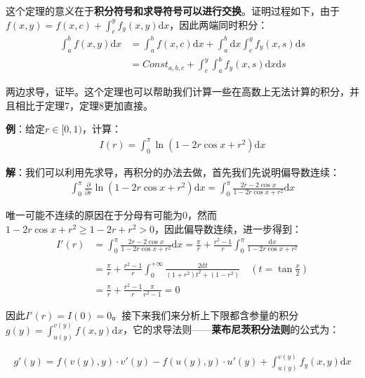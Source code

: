 \documentclass{ctexart}
\let\oldtextbf\textbf
\renewcommand{\textbf}[1]{\textcolor{brown!50!red}{\oldtextbf{#1}}}
\begin{document}
这个定理的意义在于\textbf{\color{brown!50!red}积分符号和求导符号可以进行交换}。证明过程如下，由于$f(x,y)=f(x,c)+\int_c^y f_y(x,y)\mathrm{d}x$，因此两端同时积分：
\begin{align*}
  \int_a^bf(x,y)\mathrm{d}x&=\int_a^b f(x,c)\mathrm{d}x+ \int_a^b\mathrm{d}x\int_c^yf_y(x,s)\mathrm{d}s\\
   &=Const_{a,b,c}+\int_c^y\int_a^b f_y(x,s)\mathrm{d}x\mathrm{d}s
\end{align*}

两边求导，证毕。这个定理也可以帮助我们计算一些在高数上无法计算的积分，并且相比于定理7，定理8更加直接。

\textbf{\color{brown!50!red}例}：给定$r\in[0,1)$，计算：
\begin{align*}
    I(r)=\int_0^\pi \ln(1-2r\cos x+r^2)\mathrm{d}x
\end{align*}

\textbf{\color{brown!50!red}解}：我们可以利用先求导，再积分的办法去做，首先我们先说明偏导数连续：
\begin{align*}
 \int_0^\pi \frac{\partial}{\partial r} \ln(1-2r\cos x+r^2)\mathrm{d}x=\int_0^\pi \frac{2r-2\cos x}
{1-2r\cos x+r^2}\mathrm{d}x  
\end{align*}

唯一可能不连续的原因在于分母有可能为0，然而$1-2r\cos x+r^2\geq 1-2r+r^2>0$，因此偏导数连续，进一步得到：
\begin{align*}
I'(r)&=\int_0^\pi \frac{2r-2\cos x}
{1-2r\cos x+r^2}\mathrm{d}x =\frac{\pi}{r}+\frac{r^2-1}{r}\int_0^\pi \frac{\mathrm{d}x}{1-2r\cos x+r^2}\\
\\&= \frac{\pi}{r}+\frac{r^2-1}{r}\int_0^{+\infty}\frac{2\mathrm{d}t}{(1+r^2)t^2+(1-r^2)}\quad (t=\tan\frac{x}{2})\\
&=\frac{\pi}{r}+\frac{r^2-1}{r} \frac{\pi}{r^2-1}=0     
\end{align*}

因此$I'(r)=I(0)=0$。接下来我们来分析上下限都含参量的积分$g(y)=\int_{u(y)}^{v(y)}f(x,y)\mathrm{d}x$，它的求导法则——\textbf{\color{brown!50!red}莱布尼茨积分法则}的公式为：
\begin{tcolorbox}[
    colback=bac1,     %
    colframe=fra1,   %
    coltitle=white,             %
    coltext=tex1,
    title=莱布尼茨积分法则,
    fonttitle=\bfseries,        %
arc=3mm,                     %
breakable
]
\begin{align*}
    g'(y)=f(v(y),y) \cdot v'(y)-f(u(y),y)\cdot u'(y)+\int_{u(y)}^{v(y)}f_y(x,y)\mathrm{d}x
\end{align*}
\end{tcolorbox}
\end{document}
